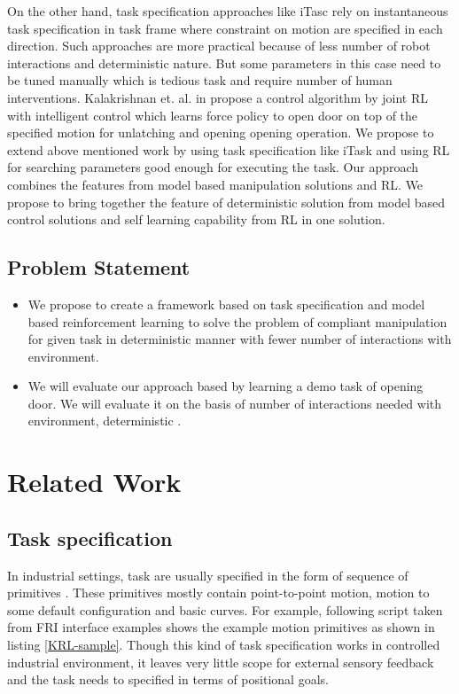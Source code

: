 \documentclass[thesis]{mas_proposal}
\begin{document}
On the other hand, task specification approaches like iTasc rely on instantaneous task specification in task frame where constraint on motion are specified in each direction. Such approaches are more practical because of less number of robot interactions and deterministic nature. But some parameters in this case need to be tuned manually which is tedious task and require number of human interventions. 
Kalakrishnan et. al. in \cite{kalakrishnan2011learning} propose a control algorithm by joint RL with intelligent control which learns force policy to open door on top of the specified motion for unlatching and opening opening operation.
We propose to extend above mentioned work by using task specification like iTask and using RL for searching parameters good enough for executing the task. Our approach combines the features from model based manipulation solutions and RL. We propose to bring together the feature of deterministic solution from model based control solutions and self learning capability from RL in one solution.  


\section{Problem Statement}
\begin{itemize}
    \item We propose to create a framework based on task specification and model based reinforcement learning to solve the problem of compliant manipulation for given task in deterministic manner with fewer number of interactions with environment.
    \item We will evaluate our approach based by learning a demo task of opening door. We will evaluate it on the basis of number of interactions needed with environment, deterministic .
\end{itemize}


\chapter{Related Work}
\section{Task specification}
In industrial settings, task are usually specified in the form of sequence of primitives \cite{leidner2017cognitive}. These primitives mostly contain point-to-point motion, motion to some default configuration and basic curves. For example, following script taken from FRI interface examples shows the example motion primitives as shown in listing \ref{KRL-sample}. Though this kind of task specification works in controlled industrial environment, it leaves very little scope for external sensory feedback and the task needs to specified in terms of positional goals.
\end{document}
